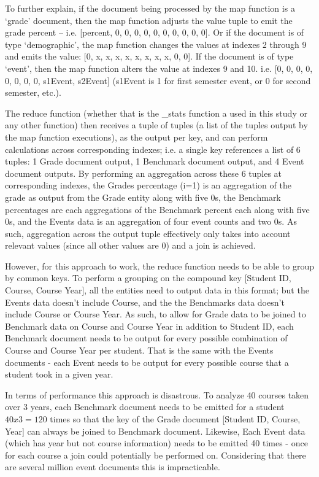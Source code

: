 To further explain, if the document being processed by the map function is a ‘grade’ document, then the map function adjusts the value tuple to emit the grade percent – i.e. [percent, 0, 0, 0, 0, 0, 0, 0, 0, 0, 0]. Or if the document is of type ‘demographic’, the map function changes the values at indexes 2 through 9 and emits the value: [0, x, x, x, x, x, x, x, x, 0, 0]. If the document is of type ‘event’, then the map function alters the value at indexes 9 and 10. i.e. [0, 0, 0, 0, 0, 0, 0, 0, s1Event, s2Event] (s1Event is 1 for first semester event, or 0 for second semester, etc.).

The reduce function (whether that is the \_stats function a used in this study or any other function) then receives a tuple of tuples (a list of the tuples output by the map function executions), as the output per key, and can perform calculations across corresponding indexes; i.e. a single key references a list of 6 tuples: 1 Grade document output, 1 Benchmark document output, and 4 Event document outputs. By performing an aggregation across these 6 tuples at corresponding indexes, the Grades percentage (i=1) is an aggregation of the grade as output from the Grade entity along with five 0s, the Benchmark percentages are each aggregations of the Benchmark percent each along with five 0s, and the Events data is an aggregation of four event counts and two 0s. As such, aggregation across the output tuple effectively only takes into account relevant values (since all other values are 0) and a join is achieved.

However, for this approach to work, the reduce function needs to be able to group by common keys. To perform a grouping on the compound key [Student ID, Course, Course Year], all the entities need to output data in this format; but the Events data doesn't include Course, and the the Benchmarks data doesn't include Course or Course Year. As such, to allow for Grade data to be joined to Benchmark data on Course and Course Year in addition to Student ID, each Benchmark document needs to be output for every possible combination of Course and Course Year per student. That is the same with the Events documents - each Event needs to be output for every possible course that a student took in a given year.

In terms of performance this approach is disastrous. To analyze 40 courses taken over 3 years, each Benchmark document needs to be emitted for a student $40 x 3 = 120$ times so that the key of the Grade document [Student ID, Course, Year] can always be joined to Benchmark document. Likewise, Each Event data (which has year but not course information) needs to be emitted 40 times - once for each course a join could potentially be performed on. Considering that there are several million event documents this is impracticable.

